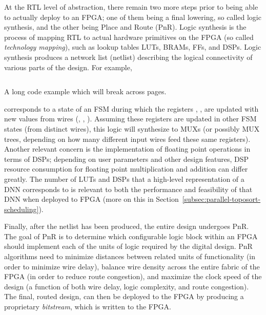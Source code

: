 At the RTL level of abstraction, there remain two more steps prior to being able to actually deploy to an FPGA; one of them being a final lowering, so called logic synthesis, and the other being Place and Route (PnR).
Logic synthesis is the process of mapping RTL to actual hardware primitives on the FPGA (so called \emph{technology mapping}), such as lookup tables LUTs, BRAMs, FFs, and DSPs.
Logic synthesis produces a network list (netlist) describing the logical connectivity of various parts of the design.
For example,
\begin{longlisting}
	\inputminted{verilog}{sources/always.v}
	\caption[Long Code Example]{A long code example which will break across pages.}
	\label{lst:long}
\end{longlisting}
\noindent corresponds to a state of an FSM during which the registers , ,  are updated with new values from wires (, , ).
Assuming these registers are updated in other FSM states (from distinct wires), this logic will synthesize to MUXs (or possibly MUX trees, depending on how many different input wires feed these same registers).
Another relevant concern is the implementation of floating point operations in terms of DSPs; depending on user parameters and other design features, DSP resource consumption for floating point multiplication and addition can differ greatly.
The number of LUTs and DSPs that a high-level representation of a DNN corresponds to is relevant to both the performance and feasibility of that DNN when deployed to FPGA (more on this in Section~\ref{subsec:parallel-toposort-scheduling}).

Finally, after the netlist has been produced, the entire design undergoes PnR.
The goal of PnR is to determine which configurable logic block within an FPGA should implement each of the units of logic required by the digital design.
PnR algorithms need to minimize distances between related units of functionality (in order to minimize wire delay), balance wire density across the entire fabric of the FPGA (in order to reduce route congestion), and maximize the clock speed of the design (a function of both wire delay, logic complexity, and route congestion).
The final, routed design, can then be deployed to the FPGA by producing a proprietary \emph{bitstream}, which is written to the FPGA.

